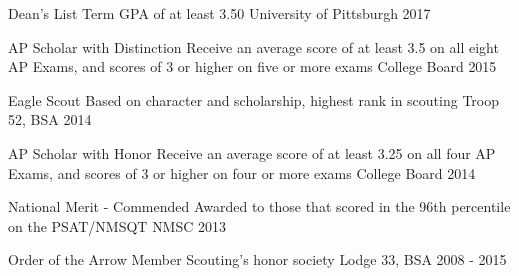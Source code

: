 
\vspace{-1mm}
\begin{cvhonors}

  \cvhonor
    {Dean's List} %
    {Term GPA of at least 3.50} %
    {University of Pittsburgh} %
    {2017} %

  \cvhonor
    {AP Scholar with Distinction} %
    {Receive an average score of at least 3.5 on all eight AP Exams, and scores of 3 or higher on five or more exams} %
    {College Board} %
    {2015} %

  \cvhonor
    {Eagle Scout} %
    {Based on character and scholarship, highest rank in scouting} %
    {Troop 52, BSA} %
    {2014} %

  \cvhonor
    {AP Scholar with Honor} %
    {Receive an average score of at least 3.25 on all four AP Exams, and scores of 3 or higher on four or more exams} %
    {College Board} %
    {2014} %

  \cvhonor
    {National Merit - Commended} %
    {Awarded to those that scored in the 96th percentile on the PSAT/NMSQT} %
    {NMSC} %
    {2013} %

  \cvhonor
    {Order of the Arrow Member} %
    {Scouting’s honor society} %
    {Lodge 33, BSA} %
    {2008 - 2015} %

\end{cvhonors}
